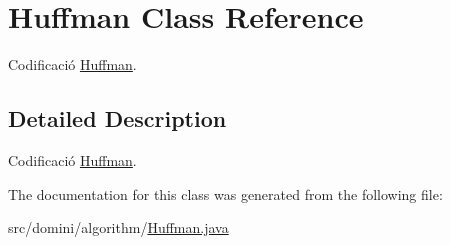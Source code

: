 \hypertarget{classHuffman}{}\section{Huffman Class Reference}
\label{classHuffman}


Codificació \hyperlink{classHuffman}{Huffman}.  




\subsection{Detailed Description}
Codificació \hyperlink{classHuffman}{Huffman}. 

The documentation for this class was generated from the following file\+:\begin{DoxyCompactItemize}
\item 
src/domini/algorithm/\hyperlink{Huffman_8java}{Huffman.\+java}\end{DoxyCompactItemize}
